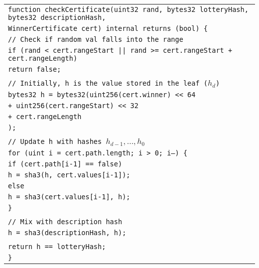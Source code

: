 \documentclass[a4paper]{article}
\begin{document}
    \begin{center}
        \begin{tabular}{l}
            \texttt{function checkCertificate(uint32 rand, bytes32 lotteryHash, bytes32 descriptionHash, }\\
            \qquad\qquad\qquad\qquad\qquad\qquad\qquad \texttt{WinnerCertificate cert) internal returns (bool) \{ }\\
            \qquad \texttt{// Check if random val falls into the range}\\
            \qquad \texttt{if (rand < cert.rangeStart || rand >= cert.rangeStart + cert.rangeLength)}\\
            \qquad\qquad \texttt{return false;}\\
            \\
            \qquad\texttt{// Initially, h is the value stored in the leaf ($h_d$)}\\
            \qquad \texttt{bytes32 h = bytes32(uint256(cert.winner) << 64}\\
            \qquad\qquad\qquad\qquad \texttt{+ uint256(cert.rangeStart) << 32}\\
            \qquad\qquad\qquad\qquad \texttt{+ cert.rangeLength}\\
            \qquad\qquad\qquad\qquad \texttt{);}\\
            \\
            \qquad \texttt{// Update h with hashes $h_{d-1}, \ldots, h_0$}\\
            \qquad\texttt{for (uint i = cert.path.length; i > 0; i--) \{}\\
            \qquad\qquad \texttt{if (cert.path[i-1] == false)}\\
            \qquad\qquad\qquad \texttt{h = sha3(h, cert.values[i-1]);}\\
            \qquad\qquad \texttt{else}\\
            \qquad\qquad\qquad\texttt{h = sha3(cert.values[i-1], h);}\\
            \qquad\texttt{\}}\\
            \\
            \qquad\texttt{// Mix with description hash}\\
            \qquad\texttt{h = sha3(descriptionHash, h);}\\
            \\
            \qquad\texttt{return h == lotteryHash;}\\
            \texttt{\}}
        \end{tabular}
    \end{center}
\end{document}
